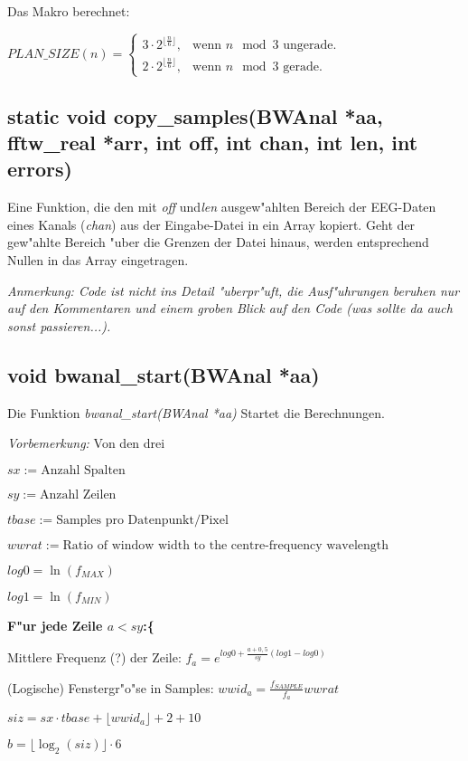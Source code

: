 \documentclass[12pt]{amsart}
\begin{document}
Das Makro berechnet:

$PLAN\_SIZE(n) = \begin{cases}
  3 \cdot 2^{\lfloor \frac{n}{6} \rfloor },  & \text{wenn }n\mod 3 \text{ ungerade.}\\
  2 \cdot 2^{\lfloor \frac{n}{6} \rfloor },  & \text{wenn }n\mod 3 \text{ gerade.}
\end{cases}$


\subsection{static void copy\_samples(BWAnal *aa, fftw\_real *arr, int off, int chan, int len, int errors)} Eine Funktion, die den mit \emph{off} und\emph{len} ausgew"ahlten Bereich der EEG-Daten eines Kanals (\emph{chan}) aus der Eingabe-Datei in ein Array kopiert. Geht der gew"ahlte Bereich "uber die Grenzen der Datei hinaus, werden entsprechend Nullen in das Array eingetragen.

\emph{Anmerkung: Code ist nicht ins Detail "uberpr"uft, die Ausf"uhrungen beruhen nur auf den Kommentaren und einem groben Blick auf den Code (was sollte da auch sonst passieren...).}


\subsection{void bwanal\_start(BWAnal *aa)} Die Funktion \emph{bwanal\_start(BWAnal *aa)} Startet die Berechnungen.

\emph{Vorbemerkung:} Von den drei

$sx:= \text{Anzahl Spalten}$

$sy:= \text{Anzahl Zeilen}$

$tbase:= \text{Samples pro Datenpunkt/Pixel}$

$wwrat:= \text{Ratio of window width to the centre-frequency wavelength}$

$log0 = \ln(f_{MAX})$

$log1 = \ln(f_{MIN})$

\textbf{F"ur jede Zeile $a<sy$:\{}

Mittlere Frequenz (?) der Zeile: $\displaystyle{f_a= e^{log0 + \frac{a+0,5}{sy} \left(log1-log0\right)}}$

(Logische) Fenstergr"o"se in Samples: $wwid_a= \frac{f_{SAMPLE}}{f_a} wwrat $

$siz= sx\cdot tbase + \lfloor wwid_a \rfloor + 2 + 10$

$b= \lfloor \log_2\left(siz\right)\rfloor \cdot 6$
\end{document}
